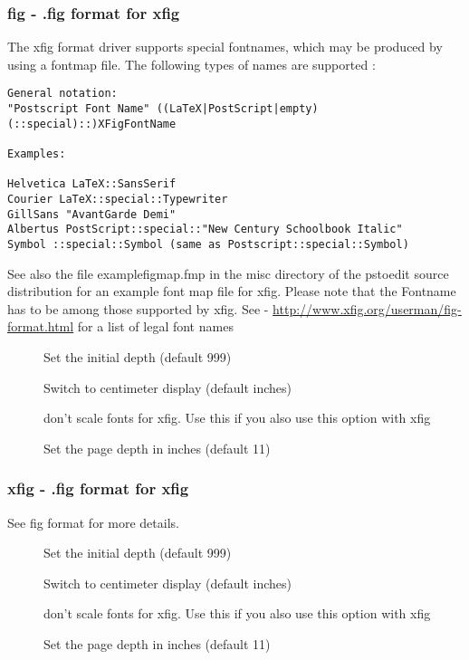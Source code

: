 \documentclass[english,a4paper]{article}
\let\URL\url \let\Email\url \let\File\url
\begin{document}
\subsubsection{fig - .fig format for xfig}
The xfig format driver supports special fontnames, which may be produced by using a fontmap file. The following types of names are supported : \\  
\begin{verbatim}
General notation: 
"Postscript Font Name" ((LaTeX|PostScript|empty)(::special)::)XFigFontName
 
Examples:

Helvetica LaTeX::SansSerif
Courier LaTeX::special::Typewriter
GillSans "AvantGarde Demi"
Albertus PostScript::special::"New Century Schoolbook Italic" 
Symbol ::special::Symbol (same as Postscript::special::Symbol)
\end{verbatim}
See also the file examplefigmap.fmp in the misc directory of the pstoedit source distribution for an example font map file for xfig. Please note that the Fontname has to be among those supported by xfig. See - \URL{http://www.xfig.org/userman/fig-format.html} for a list of legal font names

\begin{description}
\item[] 
Set the initial depth (default 999)


\item[] 
Switch to centimeter display (default inches)


\item[] 
don't scale fonts for xfig. Use this if you also use this option with xfig


\item[] 
Set the page depth in inches (default 11)


\end{description}
\subsubsection{xfig - .fig format for xfig}
See fig format for more details.

\begin{description}
\item[] 
Set the initial depth (default 999)


\item[] 
Switch to centimeter display (default inches)


\item[] 
don't scale fonts for xfig. Use this if you also use this option with xfig


\item[] 
Set the page depth in inches (default 11)


\end{description}
\end{document}

